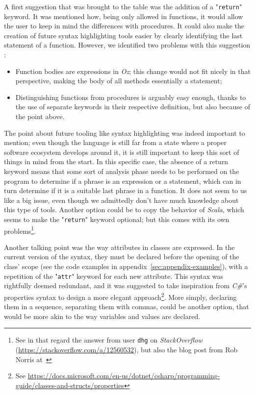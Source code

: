 A first suggestion that was brought to the table was the addition of a "\texttt{return}" keyword.
It was mentioned how, being only allowed in functions, it would allow the user to keep in mind the differences with procedures.
It could also make the creation of future syntax highlighting tools easier by clearly identifying the last statement of a function.
However, we identified two problems with this suggestion :
\begin{itemize}
    \item Function bodies are expressions in \textit{Oz}; this change would not fit nicely in that perspective, making the body of all methods essentially a statement;
    \item Distinguishing functions from procedures is arguably easy enough, thanks to the use of separate keywords in their respective definition, but also because of the point above.
\end{itemize}
The point about future tooling like syntax highlighting was indeed important to mention;
even though the language is still far from a state where a proper software ecosystem develops around it, it is still important to keep this sort of things in mind from the start.
In this specific case, the absence of a return keyword means that some sort of analysis phase needs to be performed on the program to determine if a phrase is an expression or a statement, which can in turn determine if it is a suitable last phrase in a function.
It does not seem to us like a big issue, even though we admittedly don't have much knowledge about this type of tools.
Another option could be to copy the behavior of \textit{Scala}, which seems to make the "\texttt{return}" keyword optional;
but this comes with its own problems\footnote{See in that regard the answer from user \texttt{dhg} on \textit{StackOverflow} (\url{https://stackoverflow.com/a/12560532}), but also the blog post from Rob Norris at~\cite{returnscala}}.\newline

Another talking point was the way attributes in classes are expressed.
In the current version of the syntax, they must be declared before the opening of the class' scope (see the code examples in appendix~\ref{sec:appendix-examples}), with a repetition of the "\texttt{attr}" keyword for each new attribute.
This syntax was rightfully deemed redundant, and it was suggested to take inspiration from \textit{C\#}'s properties syntax to design a more elegant approach\footnote{See \url{https://docs.microsoft.com/en-us/dotnet/csharp/programming-guide/classes-and-structs/properties}}.
More simply, declaring them in a sequence, separating them with commas, could be another option, that would be more akin to the way variables and values are declared.\newline

